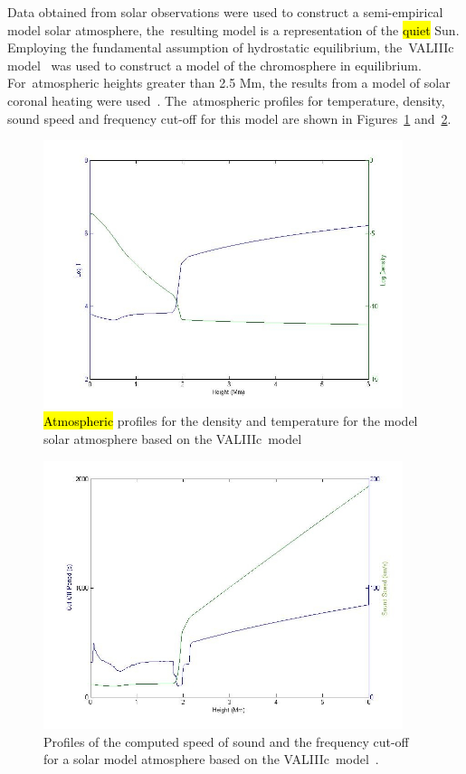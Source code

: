 \documentclass[physics,article,accept,pdftex,moreauthors]{Definitions/mdpi}
\begin{document}
Data obtained from solar observations were used to construct a semi-empirical model solar atmosphere, the~resulting model is a representation of the 
\hl{quiet} 
Sun. Employing the fundamental assumption of hydrostatic equilibrium, the~VALIIIc model~\cite{Vernazza1981} was used to construct a model of 
the chromosphere in equilibrium. For~atmospheric heights greater than 2.5 Mm, the results from a model of solar coronal heating were used~\cite{McWhirter1975}. The~atmospheric profiles for temperature, density, sound speed and frequency cut-off for this model are shown in Figures~\ref{fig3} and~\ref{fig4}.

\begin{figure}[H]
\includegraphics[width=10.5cm]{VAL3C_rho_temp_fig1L.jpg}
\caption{\hl{Atmospheric} %
 profiles for the density and temperature for the model solar atmosphere based on the VALIIIc~model~ %
\label{fig3}}
\end{figure}
\unskip

\begin{figure}[H]
\includegraphics[width=10.5cm]{soundspeedVAL3C_profile_fig1R.jpg}
\caption{Profiles of the computed speed of sound and the frequency cut-off for a solar model atmosphere based on the 
VALIIIc~model~.
\label{fig4}}
\end{figure}
\end{document}
